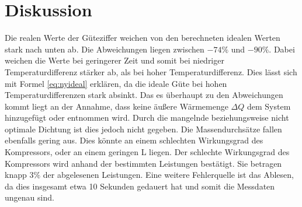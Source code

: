 
\section{Diskussion}
\label{sec:Diskussion}

Die realen Werte der Güteziffer weichen von den berechneten idealen Werten stark nach unten ab. Die Abweichungen liegen zwischen $-74 \%$ und $-90 \%$. Dabei weichen die Werte bei geringerer Zeit und somit bei niedriger Temperaturdifferenz stärker ab, als bei hoher Temperaturdifferenz. Dies lässt sich mit Formel \eqref{eq:nyideal} erklären, da die ideale Güte bei hohen Temperaturdifferenzen stark absinkt. Das es überhaupt zu den Abweichungen kommt liegt an der Annahme, dass keine äußere Wärmemenge $\Delta Q$ dem System hinzugefügt oder entnommen wird. Durch die mangelnde beziehungsweise nicht optimale Dichtung ist dies jedoch nicht gegeben. Die Massendurchsätze fallen ebenfalls gering aus. Dies könnte an einem schlechten Wirkungsgrad des Kompressors, oder an einem geringen L liegen.
Der schlechte Wirkungsgrad des Kompressors wird anhand der bestimmten Leistungen bestätigt.  Sie betragen knapp $3 \%$ der abgelesenen Leistungen. Eine weitere Fehlerquelle ist das Ablesen, da dies insgesamt etwa 10 Sekunden gedauert hat und somit die Messdaten ungenau sind. 